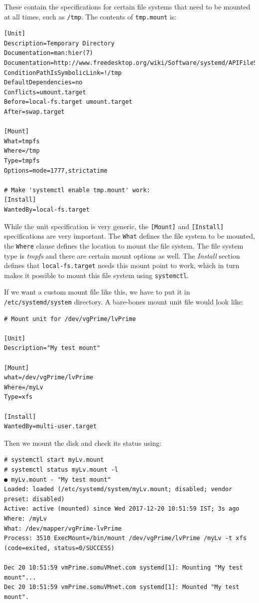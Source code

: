 \noindent
These contain the specifications for certain file systems that need to be mounted at all times, such as \verb|/tmp|. The contents of \verb|tmp.mount| is:

\vspace{-15pt}
\begin{verbatim}
[Unit]
Description=Temporary Directory
Documentation=man:hier(7)
Documentation=http://www.freedesktop.org/wiki/Software/systemd/APIFileSystems
ConditionPathIsSymbolicLink=!/tmp
DefaultDependencies=no
Conflicts=umount.target
Before=local-fs.target umount.target
After=swap.target

[Mount]
What=tmpfs
Where=/tmp
Type=tmpfs
Options=mode=1777,strictatime

# Make 'systemctl enable tmp.mount' work:
[Install]
WantedBy=local-fs.target
\end{verbatim}
\vspace{-10pt}

\noindent
While the unit specification is very generic, the \verb|[Mount]| and \verb|[Install]| specifications are very important. The \verb|What| defines the file system to be mounted, the \verb|Where| clause defines the location to mount the file system. The file system type is \textit{tmpfs} and there are certain mount options as well. The \textit{Install} section defines that \verb|local-fs.target| needs this mount point to work, which in turn makes it possible to mount this file system using \verb|systemctl|.

If we want a custom mount file like this, we have to put it in \verb|/etc/systemd/system| directory. A bare-bones mount unit file would look like:

\vspace{-15pt}
\begin{verbatim}
# Mount unit for /dev/vgPrime/lvPrime

[Unit]
Description="My test mount"

[Mount]
what=/dev/vgPrime/lvPrime
Where=/myLv
Type=xfs

[Install]
WantedBy=multi-user.target
\end{verbatim}
\vspace{-10pt}

\noindent
Then we mount the disk and check its status using:

\vspace{-15pt}
\begin{verbatim}
# systemctl start myLv.mount
# systemctl status myLv.mount -l
● myLv.mount - "My test mount"
Loaded: loaded (/etc/systemd/system/myLv.mount; disabled; vendor preset: disabled)
Active: active (mounted) since Wed 2017-12-20 10:51:59 IST; 3s ago
Where: /myLv
What: /dev/mapper/vgPrime-lvPrime
Process: 3510 ExecMount=/bin/mount /dev/vgPrime/lvPrime /myLv -t xfs (code=exited, status=0/SUCCESS)

Dec 20 10:51:59 vmPrime.somuVMnet.com systemd[1]: Mounting "My test mount"...
Dec 20 10:51:59 vmPrime.somuVMnet.com systemd[1]: Mounted "My test mount".
\end{verbatim}
\vspace{-10pt}


